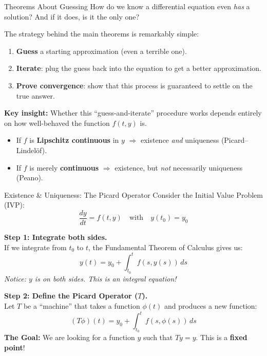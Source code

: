 
\begin{frame}{Theorems About Guessing}
How do we know a differential equation even \emph{has} a solution? And if it does, is it the only one?

\vspace{0.4cm}

The strategy behind the main theorems is remarkably simple:

\begin{enumerate}
    \item \textbf{Guess} a starting approximation (even a terrible one).
    \item \textbf{Iterate}: plug the guess back into the equation to get a better approximation.
    \item \textbf{Prove convergence}: show that this process is guaranteed to settle on the true answer.
\end{enumerate}

\vspace{0.4cm}

\textbf{Key insight:} Whether this ``guess-and-iterate'' procedure works depends entirely on how well-behaved the function $f(t, y)$ is.

\begin{itemize}
    \item If $f$ is \textbf{Lipschitz continuous} in $y$ $\Rightarrow$ existence \emph{and} uniqueness (Picard--Lindelöf).
    \item If $f$ is merely \textbf{continuous} $\Rightarrow$ existence, but \emph{not} necessarily uniqueness (Peano).
\end{itemize}
\end{frame}


\begin{frame}{Existence \& Uniqueness: The Picard Operator}
Consider the Initial Value Problem (IVP):
\[
\frac{dy}{dt} = f(t, y) \quad \text{with} \quad y(t_0) = y_0
\]

\textbf{Step 1: Integrate both sides.} \\
If we integrate from $t_0$ to $t$, the Fundamental Theorem of Calculus gives us:
\[
y(t) = y_0 + \int_{t_0}^t f(s, y(s)) \, ds
\]
\textit{Notice: $y$ is on both sides. This is an integral equation!}

\textbf{Step 2: Define the Picard Operator ($T$).} \\
Let $T$ be a ``machine'' that takes a function $\phi(t)$ and produces a new function:
\[
(T\phi)(t) = y_0 + \int_{t_0}^t f(s, \phi(s)) \, ds
\]
\textbf{The Goal:} We are looking for a function $y$ such that $Ty = y$. This is a \textbf{fixed point}!
\end{frame}

